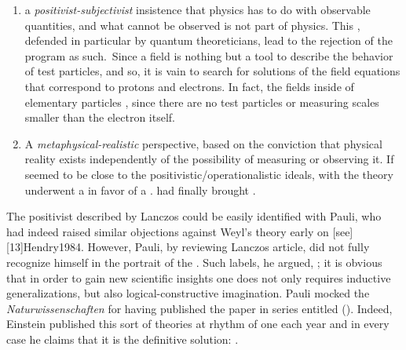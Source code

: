 \documentclass[draft]{article}
\begin{document}
\begin{enumerate}
\item\label{p} a \emph{positivist-subjectivist} insistence that physics has to do with observable quantities, and what cannot be observed is not part of physics. This  \citep[104]{Lanczos1931}, defended in particular by quantum theoreticians, lead to the rejection of the \uft program as such.\ Since a field is nothing but a tool to describe the behavior of test particles, \rac and so, it is vain to search for solutions of the field equations that correspond to protons and electrons. In fact, the fields inside of elementary particles  \citep[104]{Lanczos1931}, since there are no test particles or measuring scales smaller than the electron itself. 

\item\label{m} A \emph{metaphysical-realistic} perspective, based on the conviction that physical reality exists independently of the possibility of measuring or observing it. If \sr seemed to be close to the positivistic/operationalistic ideals, with \Mink the theory underwent a  in favor of a  \citep[103]{Lanczos1931}. \Gr had finally brought  \citep[102]{Lanczos1931}. 
\end{enumerate} 
%
The positivist described by Lanczos could be easily identified with Pauli, who had indeed raised similar objections against Weyl's theory early on [see][13]{Hendry1984}. However, Pauli,  by reviewing Lanczos article, did not fully recognize himself in the portrait of the  \citep{Pauli1932-3-11}. Such labels, he argued, ; it is obvious that in order to gain new scientific insights one does not only requires inductive generalizations, but also logical-constructive imagination. Pauli mocked the \emph{Naturwissenschaften} for having published the paper in series entitled  (). Indeed, Einstein published this sort of theories at rhythm of one each year and in every case he claims that it is the definitive solution: . 
\end{document}
